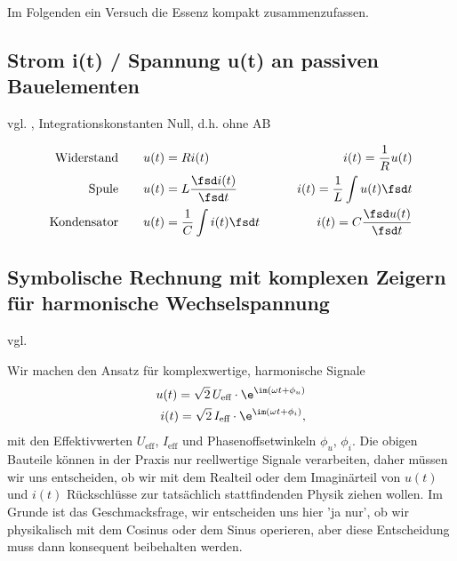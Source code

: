 Im Folgenden ein Versuch die Essenz kompakt zusammenzufassen.

\subsection{Strom i(t) / Spannung u(t) an passiven Bauelementen}

vgl. \cite[Kap. 10.2.2]{Marinescu2020}, Integrationskonstanten Null, d.h. ohne AB

\begin{align}
\text{Widerstand} \qquad & u(t) = R i(t) \qquad& i(t) = \frac{1}{R} u(t)\\
\text{Spule} \qquad & u(t) = L \frac{\fsd i(t)}{\fsd t} \qquad& i(t) = \frac{1}{L} \int u(t) \fsd t\\
\text{Kondensator} \qquad & u(t) = \frac{1}{C} \int i(t) \fsd t \qquad& i(t) = C \frac{\fsd u(t)}{\fsd t}
\end{align}

\subsection{Symbolische Rechnung mit komplexen Zeigern für harmonische Wechselspannung}

vgl. \cite[Kap. 10.3]{Marinescu2020}

Wir machen den Ansatz für komplexwertige, harmonische Signale
\begin{align}
u(t) = \sqrt{2} \, U_\text{eff} \cdot \e^{\im(\omega t + \phi_u)}\\
i(t) = \sqrt{2} \, I_\text{eff} \cdot \e^{\im(\omega t + \phi_i)},
\end{align}
mit den Effektivwerten $U_\text{eff}$, $I_\text{eff}$ und Phasenoffsetwinkeln
$\phi_u$, $\phi_i$.
%
Die obigen Bauteile können in der Praxis nur reellwertige Signale
verarbeiten, daher müssen wir uns entscheiden, ob wir mit dem Realteil oder dem
Imaginärteil von $u(t)$ und $i(t)$ Rückschlüsse zur tatsächlich stattfindenden
Physik ziehen wollen.
Im Grunde ist das Geschmacksfrage, wir entscheiden uns hier 'ja nur', ob wir
physikalisch mit dem Cosinus oder dem Sinus operieren, aber diese Entscheidung
muss dann konsequent beibehalten werden.

